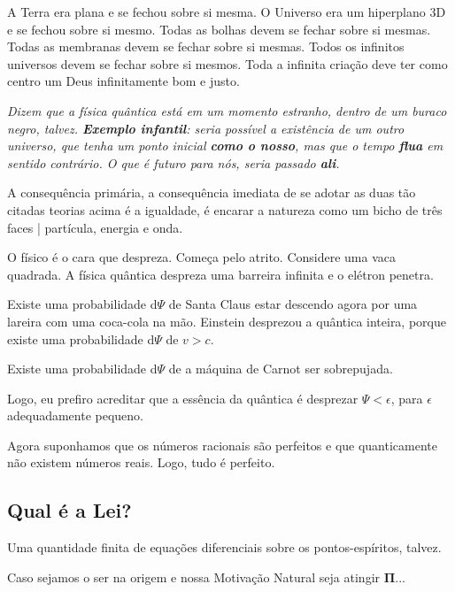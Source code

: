 \documentclass[12pt,a4paper]{article}
\begin{document}
			A Terra era plana e se fechou sobre si mesma. O Universo era um hiperplano 3D e se fechou sobre si mesmo. Todas as bolhas devem se fechar sobre si mesmas. Todas as membranas devem se fechar sobre si mesmas. Todos os infinitos universos devem se fechar sobre si mesmos. Toda a infinita cria\c{c}\~ao deve ter como centro um Deus infinitamente bom e justo.

			\emph{Dizem que a f\'isica qu\^antica est\'a em um momento estranho, dentro de um buraco negro, talvez. \textbf{Exemplo infantil}: seria poss\'ivel a exist\^encia de um outro universo, que tenha um ponto inicial \textbf{como o nosso}, mas que o tempo\cite{tempo} \textbf{flua} em sentido contr\'ario. O que \'e futuro para n\'os, seria passado \textbf{ali}.}

A consequ\^encia prim\'aria, a consequ\^encia imediata de se
adotar as duas t\~ao citadas teorias acima \'e a igualdade, \'e encarar a
natureza como um bicho de tr\^es faces | part\'icula, energia e onda.

O f\'isico \'e o cara que despreza. Come\c{c}a pelo atrito. Considere uma vaca
quadrada. A f\'isica qu\^antica despreza uma barreira infinita e o el\'etron
penetra.

Existe uma probabilidade d$\Psi$ de
Santa Claus estar descendo agora por uma lareira com uma coca-cola na
m\~ao.
Einstein desprezou a qu\^antica inteira, porque existe uma probabilidade d$\Psi$ de $v > c$.

Existe uma probabilidade d$\Psi$ de a
 m\'aquina de Carnot ser sobrepujada.

Logo, eu prefiro acreditar que a ess\^encia da qu\^antica \'e desprezar $\Psi < \epsilon$, para $\epsilon$ adequadamente pequeno.

Agora suponhamos que os n\'umeros racionais s\~ao perfeitos e que
quanticamente n\~ao existem n\'umeros reais. Logo, tudo \'e perfeito.

		\subsection{Qual \'e a Lei?}\label{leiPerfeicao}
			\begin{flushright}
			\end{flushright}

			Uma quantidade finita de equa\c{c}\~oes diferenciais sobre os pontos-esp\'iritos, talvez.

			Caso sejamos o ser na origem e nossa Motiva\c{c}\~ao Natural seja atingir $ \mathbf{\Pi} $...
\end{document}
